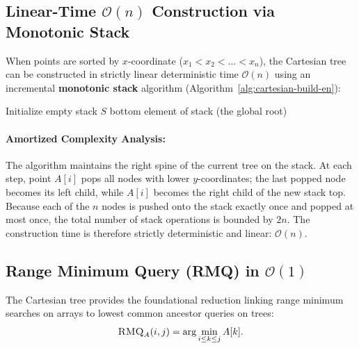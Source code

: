 \subsection{Linear-Time $\mathcal{O}(n)$ Construction via Monotonic Stack}
When points are sorted by $x$-coordinate ($x_1 < x_2 < \dots < x_n$), the Cartesian tree can be constructed in strictly linear deterministic time $\mathcal{O}(n)$ using an incremental \textbf{monotonic stack} algorithm (Algorithm~\ref{alg:cartesian-build-en}):

\begin{algorithm}[H]
\caption{Linear Cartesian Tree Construction ($\textsc{Build-Cartesian}(A[1 \dots n])$)}
\label{alg:cartesian-build-en}
\BlankLine
Initialize empty stack $S$\;
\Return bottom element of stack (the global root)\;
\end{algorithm}

\paragraph{Amortized Complexity Analysis:}
The algorithm maintains the right spine of the current tree on the stack. At each step, point $A[i]$ pops all nodes with lower $y$-coordinates; the last popped node becomes its left child, while $A[i]$ becomes the right child of the new stack top. Because each of the $n$ nodes is pushed onto the stack exactly once and popped at most once, the total number of stack operations is bounded by $2n$. The construction time is therefore strictly deterministic and linear: $\mathcal{O}(n)$.

\subsection{Range Minimum Query (RMQ) in $\mathcal{O}(1)$}
The Cartesian tree provides the foundational reduction linking range minimum searches on arrays to lowest common ancestor queries on trees:
\begin{equation}
  \textsc{RMQ}_A(i, j) = \arg\min_{i \le k \le j} A[k].
\end{equation}

